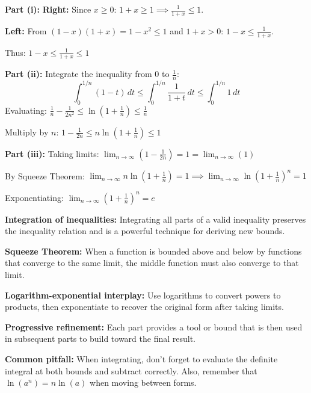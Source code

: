 \begin{solution}
\textbf{Part (i):} \textbf{Right:} Since $x \geq 0$: $1+x \geq 1 \implies \frac{1}{1+x} \leq 1$.

\textbf{Left:} From $(1-x)(1+x) = 1-x^2 \leq 1$ and $1+x > 0$: $1-x \leq \frac{1}{1+x}$.

Thus: $1-x \leq \frac{1}{1+x} \leq 1$

\textbf{Part (ii):} Integrate the inequality from $0$ to $\frac{1}{n}$:
\[
\int_{0}^{1/n} (1-t) \, dt \leq \int_{0}^{1/n} \frac{1}{1+t} \, dt \leq \int_{0}^{1/n} 1 \, dt
\]
Evaluating: $\frac{1}{n} - \frac{1}{2n^2} \leq \ln\left(1+\frac{1}{n}\right) \leq \frac{1}{n}$

Multiply by $n$: $1 - \frac{1}{2n} \leq n\ln\left(1+\frac{1}{n}\right) \leq 1$

\textbf{Part (iii):} Taking limits: $\lim_{n\to\infty} \left( 1 - \frac{1}{2n} \right) = 1 = \lim_{n\to\infty} (1)$

By Squeeze Theorem: $\lim_{n\to\infty} n\ln\left(1+\frac{1}{n}\right) = 1 \implies \lim_{n\to\infty} \ln\left(1+\frac{1}{n}\right)^n = 1$

Exponentiating: $\lim_{n\to\infty} \left(1+\frac{1}{n}\right)^n = e$
\end{solution}

\begin{takeaways}

    \item \textbf{Integration of inequalities:} Integrating all parts of a valid inequality preserves the inequality relation and is a powerful technique for deriving new bounds.
    \item \textbf{Squeeze Theorem:} When a function is bounded above and below by functions that converge to the same limit, the middle function must also converge to that limit.
    \item \textbf{Logarithm-exponential interplay:} Use logarithms to convert powers to products, then exponentiate to recover the original form after taking limits.
    \item \textbf{Progressive refinement:} Each part provides a tool or bound that is then used in subsequent parts to build toward the final result.
    \item \textbf{Common pitfall:} When integrating, don't forget to evaluate the definite integral at both bounds and subtract correctly. Also, remember that $\ln\left(a^n\right) = n\ln(a)$ when moving between forms.

\end{takeaways}

